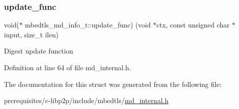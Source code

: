 \subsubsection{\texorpdfstring{update\+\_\+func}{update\_func}}
{\footnotesize\ttfamily void($\ast$ mbedtls\+\_\+md\+\_\+info\+\_\+t\+::update\+\_\+func) (void $\ast$ctx, const unsigned char $\ast$input, size\+\_\+t ilen)}

Digest update function 

Definition at line 64 of file md\+\_\+internal.\+h.



The documentation for this struct was generated from the following file\+:\begin{DoxyCompactItemize}
\item 
prerequisites/c-\/libp2p/include/mbedtls/\mbox{\hyperlink{md__internal_8h}{md\+\_\+internal.\+h}}\end{DoxyCompactItemize}
